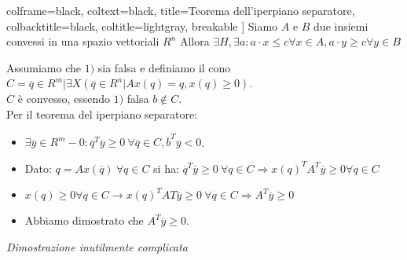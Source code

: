 \documentclass{article}
\begin{document}
\begin{tcolorbox}[
    colback=lightgray,
    colframe=black,
    coltext=black,
    title=Dimostrazione,
    colbacktitle=black,
    coltitle=lightgray,
    breakable
  ]
\begin{enumerate}
\begin{tcolorbox}
              colframe=black,
              coltext=black,
              title=Teorema dell'iperpiano separatore,
              colbacktitle=black,
              coltitle=lightgray,
              breakable
            ]
            Siamo $A$ e $B$ due insiemi convessi in una spazio vettoriali $R^n$ Allora $\exists H, \exists a : a\cdot x \le c \forall x \in A, a \cdot y \ge c \forall y \in B$
          \end{tcolorbox}
          Assumiamo che $1)$ sia falsa e definiamo il cono $C={\overline{q}\in R^m|\exists X(\overline{q}\in R^n|Ax(q)=q, x(q) \ge 0)}$.\\ $C$ è convesso, essendo $1)$ falsa $b\notin C$. \\
          Per il teorema del iperpiano separatore: \\
          \begin{itemize}
            \item $\exists \overline{y}\in R^m-{0}:\overline{q}^T\overline{y} \ge 0\ \forall \overline{q} \in C, \overline{b}^T\overline{y} <0$.
            \item Dato: $q=Ax(\overline{q})\ \forall q \in C$ si ha: $\overline{q}^T\overline{y}\ge 0\ \forall q \in C \Rightarrow x(q)^TA^T\overline{y} \ge 0 \forall q \in C$
            \item $x(q)\ge 0 \forall q \in C \to x(q)^TAT\overline{y}\ge 0\ \forall q \in C \Rightarrow A^T\overline{y} \ge 0$
            \item Abbiamo dimostrato che $A^T\overline{y}\ge 0$.
          \end{itemize}
          \textit{Dimostrazione inutilmente complicata}
  \end{enumerate}
\end{tcolorbox}
\end{document}
